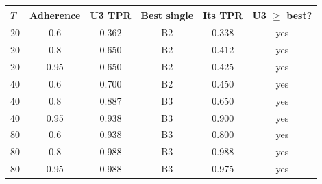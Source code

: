 \begin{tabular}{lcccc c}
\toprule
$T$ & Adherence & U3 TPR & Best single & Its TPR & U3 $\ge$ best? \\
\midrule
20 & 0.6 & 0.362 & B2 & 0.338 & yes \\
20 & 0.8 & 0.650 & B2 & 0.412 & yes \\
20 & 0.95 & 0.650 & B2 & 0.425 & yes \\
40 & 0.6 & 0.700 & B2 & 0.450 & yes \\
40 & 0.8 & 0.887 & B3 & 0.650 & yes \\
40 & 0.95 & 0.938 & B3 & 0.900 & yes \\
80 & 0.6 & 0.938 & B3 & 0.800 & yes \\
80 & 0.8 & 0.988 & B3 & 0.988 & yes \\
80 & 0.95 & 0.988 & B3 & 0.975 & yes \\
\bottomrule
\end{tabular}
